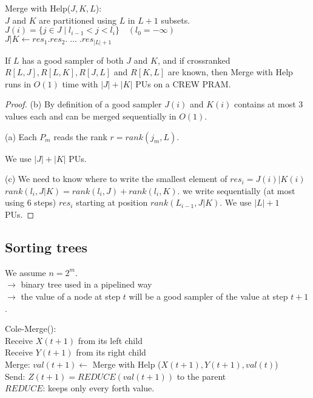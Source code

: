 \begin{algorithm}
Merge with Help($J,K,L$):\\
$J$ and $K$ are partitioned using $L$ in $L+1$ subsets.\\
$J(i)=\{ j\in J \;|\; l_{i-1}<j<l_i\} \quad (l_0=-\infty)$\\
$J|K \leftarrow res_1.res_2. \;\hdots\; . res_{|L|+1}$
\end{algorithm}

\begin{lemma}
If $L$ has a good sampler of both $J$ and $K$, and if crossranked $R[L,J], R[L,K],R[J,L]$ and $R[K,L]$ are known, then Merge with Help runs in $O(1)$ time with $|J|+|K|$ PUs on a CREW PRAM.
\end{lemma}

\begin{proof}
(b) By definition of a good sampler $J(i)$ and $K(i)$ contains at most 3 values each and can be merged sequentially in $O(1)$.

(a) Each $P_m$ reads the rank $r=rank(j_m,L)$.

\begin{algorithm}[H]
\end{algorithm}
We use $|J|+|K|$ PUs.

(c) We need to know where to write the smallest element of $res_i=J(i)|K(i)$\\
$rank(l_i, J|K)=rank(l_i,J)+rank(l_i,K)$. we write sequentially (at most using 6 steps) $res_i$ starting at position $rank(L_{i-1},J|K)$. We use $|L|+1$ PUs.
\end{proof}

\subsection{Sorting trees}
We assume $n=2^m$.\\
$\rightarrow$ binary tree used in a pipelined way\\
$\rightarrow$ the value of a node at step $t$ will be a good sampler of the value at step $t+1$.

\begin{algorithm}[H]
Cole-Merge():\\
Receive $X(t+1)$ from its left child\\
Receive $Y(t+1)$ from its right child\\
Merge: $val(t+1)\leftarrow$ Merge with Help ($X(t+1), Y(t+1), val(t)$)\\
Send: $Z(t+1)=REDUCE(val(t+1))$ to the parent\\
$REDUCE$: keeps only every forth value.
\end{algorithm}

